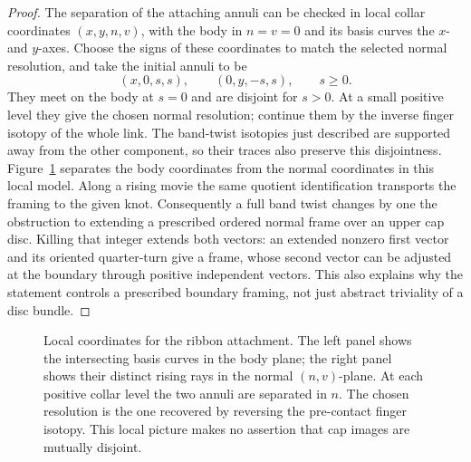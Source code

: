 \begin{proof}
The separation of the attaching annuli can be checked in local collar
coordinates $(x,y,n,v)$, with the body in $n=v=0$ and its basis curves
the $x$- and $y$-axes.  Choose the signs of these coordinates to match
the selected normal resolution, and take the initial annuli to be
\[
 (x,0,s,s),\qquad (0,y,-s,s),\qquad s\geq0.
\]
They meet on the body at $s=0$ and are disjoint for $s>0$.  At a small
positive level they give the chosen normal resolution; continue them
by the inverse finger isotopy of the whole link.  The band-twist
isotopies just described are supported away from the other component,
so their traces also preserve this disjointness.
Figure~\ref{geo:fig-ribbon} separates the body coordinates from the
normal coordinates in this local model.  Along a rising movie the same
quotient identification transports the framing to the given knot.
Consequently a full band twist changes by one the obstruction to
extending a prescribed ordered normal frame over an upper cap disc.
Killing that integer extends both vectors: an extended nonzero first
vector and its oriented quarter-turn give a frame, whose second
vector can be adjusted at the boundary through positive independent
vectors.  This also explains why the statement controls a prescribed
boundary framing, not just abstract triviality of a disc bundle.
\end{proof}

\begin{figure}[tb]
\centering

\caption{Local coordinates for the ribbon attachment.  The left panel
shows the intersecting basis curves in the body plane; the right panel
shows their distinct rising rays in the normal $(n,v)$-plane.  At each
positive collar level the two annuli are separated in $n$.  The chosen
resolution is the one recovered by reversing the pre-contact finger
isotopy.  This local picture makes no assertion that cap images are
mutually disjoint.}\label{geo:fig-ribbon}
\end{figure}

